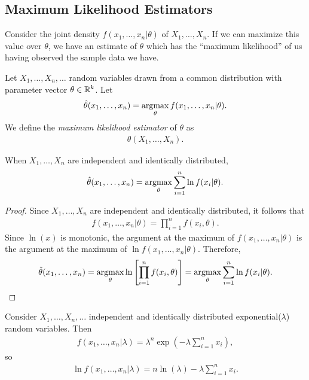 \subsection{Maximum Likelihood Estimators}

Consider the joint density $f(x_1,\ldots,x_n|\theta)$ of $X_1, \ldots, X_n$. If we can maximize this value over $\theta$, we have an estimate of $\theta$ which has the ``maximum likelihood'' of us having observed the sample data we have.

\begin{defn}
    Let $X_1, \ldots, X_n, \ldots$ random variables drawn from a common distribution with parameter vector $\theta \in \mathbb{R}^k$. Let
    \begin{align*}
        \hat{\theta}(x_1, \ldots, x_n) = \operatorname*{argmax}_{\theta}f(x_1,\ldots,x_n|\theta).
    \end{align*}
    We define the \emph{maximum likelihood estimator} of $\theta$ as
    \begin{align*}
        \theta(X_1, \ldots, X_n).
    \end{align*}
\end{defn}

\begin{prop}
    When $X_1, \ldots, X_n$ are independent and identically distributed,
    \begin{align*}
        \hat{\theta}(x_1, \ldots, x_n) = \operatorname*{argmax}_{\theta}\sum_{i=1}^{n}\ln f(x_i|\theta).
    \end{align*}
\end{prop}

\begin{proof}
    Since $X_1, \ldots, X_n$ are independent and identically distributed, it follows that
    \begin{align*}
        f(x_1, \ldots, x_n | \theta) = \prod_{i=1}^{n}f(x_i,\theta).
    \end{align*}
    Since $\ln(x)$ is monotonic, the argument at the maximum of $f(x_1, \ldots, x_n|\theta)$ is the argument at the maximum of $\ln f(x_1, \ldots, x_n|\theta)$. Therefore,
    \begin{align*}
        \hat{\theta}(x_1, \ldots, x_n) = \operatorname*{argmax}_{\theta}\ln\left[\prod_{i=1}^{n}f(x_i,\theta)\right] = \operatorname*{argmax}_{\theta}\sum_{i=1}^{n}\ln f(x_i|\theta).
    \end{align*}
\end{proof}

\begin{exmp}
    Consider $X_1, \ldots, X_n, \ldots$ independent and identically distributed exponential($\lambda$) random variables. Then
    \begin{align*}
        f(x_1, \ldots, x_n|\lambda) = \lambda^n\exp\left(-\lambda\sum_{i=1}^{n}x_i\right),
    \end{align*}
    so
    \begin{align*}
        \ln f(x_1, \ldots, x_n|\lambda) = n\ln(\lambda) - \lambda\sum_{i=1}^{n}x_i.
    \end{align*}
\end{exmp}


